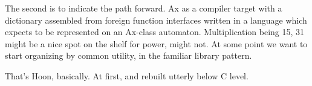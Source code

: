 \documentclass[twoside]{article}
\begin{document}
The second is to indicate the path forward. Ax as a compiler target with a dictionary assembled from foreign function interfaces written in a language which expects to be represented on an Ax-class automaton. Multiplication being 15, 31 might be a nice spot on the shelf for power, might not. At some point we want to start organizing by common utility, in the familiar library pattern.

That's Hoon, basically. At first, and rebuilt utterly below C level.

\end{document}
